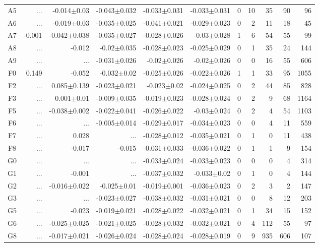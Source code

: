 \begin{table}[t]
\begin{center}
\begin{tabular}{c|rrrrr|rrrrr}
A5	&	 ...	&	-0.014$\pm$0.03	&	-0.043$\pm$0.032	&	-0.033$\pm$0.031	&	-0.033$\pm$0.031	&	0	&	10	&	35	&	90	&	96	\\
A6	&	 ...	&	-0.019$\pm$0.03	&	-0.035$\pm$0.025	&	-0.041$\pm$0.021	&	-0.029$\pm$0.023	&	0	&	2	&	11	&	18	&	45	\\
A7	&	-0.001	&	-0.042$\pm$0.038	&	-0.035$\pm$0.027	&	-0.028$\pm$0.026	&	-0.03$\pm$0.028	&	1	&	6	&	54	&	55	&	99	\\
A8	&	 ...	&	-0.012	&	-0.02$\pm$0.035	&	-0.028$\pm$0.023	&	-0.025$\pm$0.029	&	0	&	1	&	35	&	24	&	144	\\
A9	&	 ...	&	 ...	&	-0.031$\pm$0.026	&	-0.02$\pm$0.026	&	-0.02$\pm$0.026	&	0	&	0	&	16	&	55	&	606	\\
F0	&	0.149	&	-0.052	&	-0.032$\pm$0.02	&	-0.025$\pm$0.026	&	-0.022$\pm$0.026	&	1	&	1	&	33	&	95	&	1055	\\
F2	&	 ...	&	0.085$\pm$0.139	&	-0.023$\pm$0.021	&	-0.023$\pm$0.02	&	-0.024$\pm$0.025	&	0	&	2	&	44	&	85	&	828	\\
F3	&	 ...	&	0.001$\pm$0.01	&	-0.009$\pm$0.035	&	-0.019$\pm$0.023	&	-0.028$\pm$0.024	&	0	&	2	&	9	&	68	&	1164	\\
F5	&	 ...	&	-0.038$\pm$0.002	&	-0.022$\pm$0.041	&	-0.026$\pm$0.022	&	-0.03$\pm$0.024	&	0	&	2	&	4	&	54	&	1103	\\
F6	&	 ...	&	 ...	&	-0.005$\pm$0.014	&	-0.029$\pm$0.017	&	-0.034$\pm$0.023	&	0	&	0	&	4	&	11	&	559	\\
F7	&	 ...	&	0.028	&	 ...	&	-0.028$\pm$0.012	&	-0.035$\pm$0.021	&	0	&	1	&	0	&	11	&	438	\\
F8	&	 ...	&	-0.017	&	-0.015	&	-0.031$\pm$0.033	&	-0.036$\pm$0.022	&	0	&	1	&	1	&	9	&	154	\\
G0	&	 ...	&	 ...	&	 ...	&	-0.033$\pm$0.024	&	-0.033$\pm$0.023	&	0	&	0	&	0	&	4	&	314	\\
G1	&	 ...	&	-0.001	&	 ...	&	-0.037$\pm$0.032	&	-0.033$\pm$0.02	&	0	&	1	&	0	&	4	&	144	\\
G2	&	 ...	&	-0.016$\pm$0.022	&	-0.025$\pm$0.01	&	-0.019$\pm$0.001	&	-0.036$\pm$0.023	&	0	&	2	&	3	&	2	&	147	\\
G3	&	 ...	&	 ...	&	-0.023$\pm$0.027	&	-0.038$\pm$0.032	&	-0.031$\pm$0.021	&	0	&	0	&	8	&	12	&	203	\\
G5	&	 ...	&	-0.023	&	-0.019$\pm$0.021	&	-0.028$\pm$0.022	&	-0.032$\pm$0.021	&	0	&	1	&	34	&	15	&	152	\\
G6	&	 ...	&	-0.025$\pm$0.025	&	-0.021$\pm$0.025	&	-0.028$\pm$0.032	&	-0.032$\pm$0.021	&	0	&	4	&	112	&	55	&	97	\\
G8	&	 ...	&	-0.017$\pm$0.021	&	-0.026$\pm$0.024	&	-0.028$\pm$0.024	&	-0.028$\pm$0.019	&	0	&	9	&	935	&	606	&	107	\\

\end{tabular}
\end{center}
\end{table}
